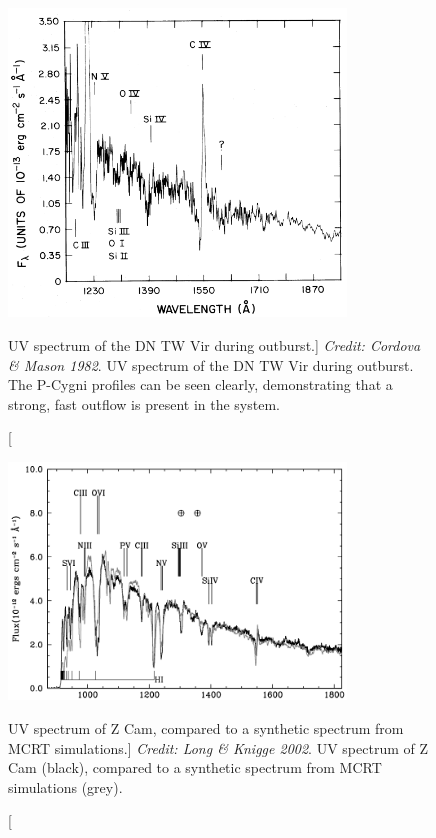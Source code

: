 \begin{figure}
\centering
\includegraphics[width=0.8\textwidth]{figures/02-outflows/cordova_mason.png}
\caption
[UV spectrum of the DN TW Vir during outburst.]
{
{\sl Credit: Cordova \& Mason 1982}. 
UV spectrum of the DN TW Vir during outburst. The P-Cygni profiles
can be seen clearly, demonstrating that a strong, fast outflow is present
in the system. 
} 
\label{fig:cordova}
\end{figure}

\begin{figure}
\centering
\includegraphics[width=0.8\textwidth]{figures/02-outflows/zcam_lk02.png}
\caption
[UV spectrum of Z Cam, compared to a synthetic spectrum from MCRT simulations.]
{
{\sl Credit: Long \& Knigge 2002}. 
UV spectrum of Z Cam (black), compared to a synthetic spectrum from MCRT simulations (grey).
} 
\label{fig:zcam_lk02}
\end{figure}

